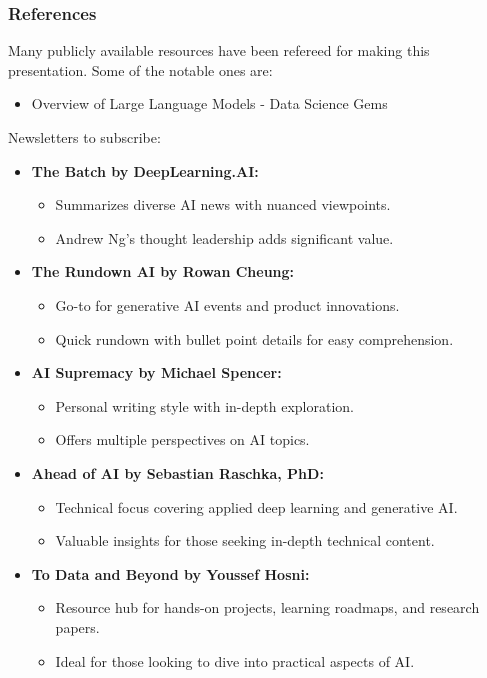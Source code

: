 \begin{frame}\frametitle{References}
Many publicly available resources have been refereed for making this presentation. Some of the notable ones are:
\footnotesize
\begin{itemize}
\item Overview of Large Language Models - Data Science Gems
\end{itemize}

Newsletters to subscribe:

\begin{itemize}
  \item \textbf{The Batch by DeepLearning.AI:}
    \begin{itemize}
      \item Summarizes diverse AI news with nuanced viewpoints.
      \item Andrew Ng's thought leadership adds significant value.
    \end{itemize}

  \item \textbf{The Rundown AI by Rowan Cheung:}
    \begin{itemize}
      \item Go-to for generative AI events and product innovations.
      \item Quick rundown with bullet point details for easy comprehension.
    \end{itemize}

  \item \textbf{AI Supremacy by Michael Spencer:}
    \begin{itemize}
      \item Personal writing style with in-depth exploration.
      \item Offers multiple perspectives on AI topics.
    \end{itemize}

  \item \textbf{Ahead of AI by Sebastian Raschka, PhD:}
    \begin{itemize}
      \item Technical focus covering applied deep learning and generative AI.
      \item Valuable insights for those seeking in-depth technical content.
    \end{itemize}

  \item \textbf{To Data and Beyond by Youssef Hosni:}
    \begin{itemize}
      \item Resource hub for hands-on projects, learning roadmaps, and research papers.
      \item Ideal for those looking to dive into practical aspects of AI.
    \end{itemize}
\end{itemize}


\end{frame}
